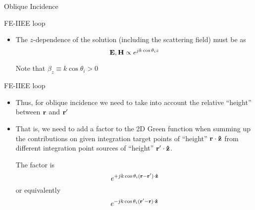 \begin{frame}[allowframebreaks]{Oblique Incidence}
\begin{block}{FE-IIEE loop}
\begin{itemize}
\begin{itemize}
        \item We work with $\rho$ instead of $r$, i.e.,
          \begin{equation*}
            |\vrho-\vrhop|=|(\vr-\vrp)-((\vr-\vrp)\cdot\zunit)\zunit|
          \end{equation*}
          where $\zunit$ stands for the direction along the cylinder
          axis\footnote{The code supports arbitrary orientations for the
            cylinder}
        \end{itemize}

      \item The $z$-dependence of the solution (including the scattering field) must be as
        \begin{equation*}
          \vE,\vH \propto   e^{j k \cos\theta_i z} %
        \end{equation*}

        Note that $\beta_z\equiv k\cos\theta_i>0$%
        
      \end{itemize}
    \end{block}

        
    \begin{block}{FE-IIEE loop \insertcontinuationtext}
      \begin{itemize}
      \item Thus, for oblique incidence we need to take into account
        the relative ``height'' between $\mathbf{r}$ and $\mathbf{r^\prime}$

      \item That is, we need to add a factor to the 2D Green function
        when summing up the contributions on given integration target
        points of ``height'' $\mathbf{r}\cdot\mathbf{\hat{z}}$ from different
        integration point sources of ``height'' $\mathbf{r^\prime}\cdot\mathbf{\hat{z}}$.

        \vbss
        
        The factor is
        \begin{equation*}
          e^{+j k \cos\theta_i (\mathbf{r}-\mathbf{r^\prime})\cdot\mathbf{\hat{z}}}
        \end{equation*}
        or equivalently 
        \begin{equation*}
          e^{-j k \cos\theta_i (\mathbf{r^\prime}-\mathbf{r})\cdot\mathbf{\hat{z}}}
        \end{equation*}
        

\end{itemize}
\end{block}
\end{frame}
